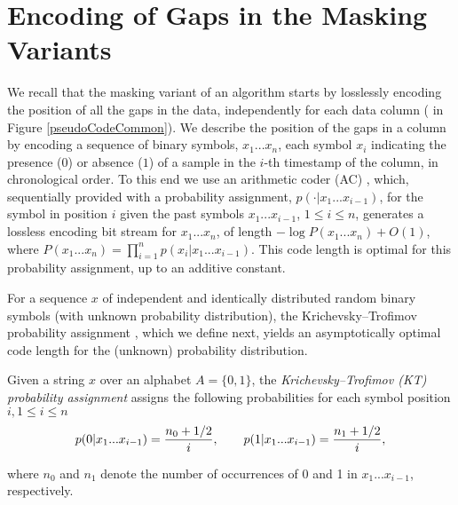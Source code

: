 
\section{Encoding of Gaps in the Masking Variants}
\label{algo:maskmodes}


\newcommand{\xOneN}{x_1...x_n}
\newcommand{\StringSeq}{x_1...x_{i-1}}
\newcommand{\xiiminus}{p(x_i|\StringSeq)}
\newcommand{\xiiminustwo}{p(\cdot|\StringSeq)}
\vspace{-5pt}
We recall that the masking variant of an algorithm starts by losslessly encoding the position of all the gaps in the data, independently for each data column ( in Figure \ref{pseudoCodeCommon}). We describe the position of the gaps in a column by encoding a sequence of binary symbols, $\xOneN$, each symbol $x_i$ indicating the presence ($0$) or absence ($1$) of a sample in the $i$-th timestamp of the column, in chronological order. To this end we use an arithmetic coder (AC) \cite{arcoding, ac2, Cover2005}, which, sequentially provided with a probability assignment, $\xiiminustwo$, for the symbol in position $i$ given the past symbols $x_1...x_{i-1}$, $1\leq i \leq n$, generates a lossless encoding bit stream for $\xOneN$, of length $-\log P(\xOneN) + O(1)$, where $P(\xOneN)=\prod_{i=1}^{n}\xiiminus$. This code length is optimal for this probability assignment, up to an additive constant.


For a sequence $x$ of independent and identically distributed random binary symbols (with unknown probability distribution), the Krichevsky–Trofimov probability assignment \cite{ktestimator}, which we define next, yields an asymptotically optimal code length for the (unknown) probability distribution.


\begin{defcion}
\label{def:ktestimator}
Given a string $x$ over an alphabet $A = \{0, 1\}$, the \textit{Krichevsky–Trofimov (KT) probability assignment} assigns the following probabilities for each symbol position $i, 1\leq i \leq n$
\vspace{-2pt}
\begin{equation}
\label{eq:ktestimator}
p(0|\StringSeq) = \frac{n_0 + 1/2}{i}, \hspace{+20pt} p(1|\StringSeq) = \frac{n_1 + 1/2}{i},
\end{equation}
\end{defcion}
\vspace{-8pt}
where $n_0$ and $n_1$ denote the number of occurrences of 0 and 1 in $\StringSeq$, respectively.


